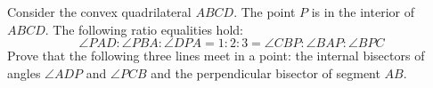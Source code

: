Consider the convex quadrilateral $ABCD$. The point $P$ is in the interior of $ABCD$. The following ratio equalities hold:
\[\angle PAD:\angle PBA:\angle DPA=1:2:3=\angle CBP:\angle BAP:\angle BPC\]Prove that the following three lines meet in a point: the internal bisectors of angles $\angle ADP$ and $\angle PCB$ and the perpendicular bisector of segment $AB$.

